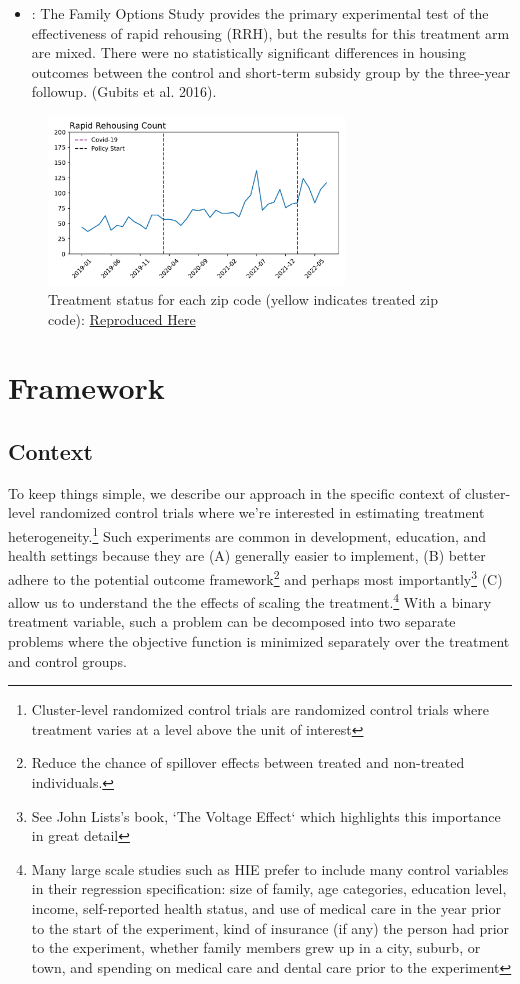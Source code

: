 \documentclass[a4paper,12pt]{article}
\begin{document}
\begin{itemize}
    \item \cite{evans2019reducing}: The Family Options Study provides the primary experimental test of the effectiveness of rapid rehousing (RRH), but the results for this treatment arm are mixed. There were no statistically significant
differences in housing outcomes between the control and short-term subsidy group by the three-year followup. (Gubits et al. 2016).
\end{itemize}
\begin{figure}[htbp]
\centering
\includegraphics[width=0.7\textwidth]{figures/rtc/context/rrh_counts.pdf}
        \caption{Treatment status for each zip code (yellow indicates treated zip code): \href{https://github.com/pharringtonp19/evictions/blob/main/scripts/cceh/plot/summary_rrh.py}{Reproduced Here}}
\end{figure}
\section{Framework}
\label{sec:framework}
\subsection{Context}
To keep things simple, we describe our approach in the specific context of cluster-level randomized control trials where we're interested in estimating treatment heterogeneity.\footnote{ Cluster-level randomized control trials are randomized control trials where treatment varies at a level above the unit of interest} Such experiments are common in development, education, and health settings because they are (A) generally easier to implement, (B) better adhere to the potential outcome framework\footnote{Reduce the chance of spillover effects between treated and non-treated individuals.} and perhaps most importantly\footnote{See John Lists's book, `The Voltage Effect` which highlights this importance in great detail} (C) allow us to understand the the effects of scaling the treatment.\footnote{Many large scale studies such as HIE prefer to include many control variables in their regression specification: size of family, age categories, education level, income, self-reported health status, and use of medical care in the year prior to the start of the experiment, kind of insurance (if any) the person had prior to the experiment, whether family members grew up in a city, suburb, or town, and spending on medical care and dental care prior to the experiment} With a binary treatment variable, such a problem can be decomposed into two separate problems where the objective function is minimized separately over the treatment and control groups.
\end{document}
